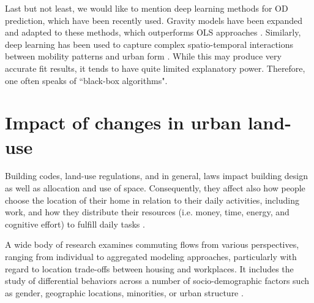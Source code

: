 Last but not least, we would like to mention deep learning methods for OD prediction, which have been recently used. Gravity models have been expanded and adapted to these methods, which outperforms OLS approaches \citep{Simini2021AGeneration}. Similarly, deep learning has been used to capture complex spatio-temporal interactions between mobility patterns and urban form \citep{Cai2022SpatialFlow, Koca2021Origin-destinationStudy, Yeghikyan2020LearningNetworks, Liu2020LearningPrediction, Yao2021SpatialNetworks, Yin2022ConvGCN-RF:Effects, Rodriguez-Rueda2021OriginDestinationModel}. While this may produce very accurate fit results, it tends to have quite limited explanatory power. Therefore, one often speaks of ``black-box algorithms".

\section{Impact of changes in urban land-use}
\label{sub:ETRCO2H_1.3intro_urban}

Building codes, land-use regulations, and in general, laws impact building design as well as allocation and use of space. Consequently, they affect also how people choose the location of their home in relation to their daily activities, including work, and how they distribute their resources (i.e. money, time, energy, and cognitive effort) to fulfill daily tasks \citep{Spadon2019ReconstructingIndicators, Simini2012APatterns, Prytherch2012, Levine2019FromPlanning, Jayarajah2018UnderstandingPlanning}. 

A wide body of research examines commuting flows from various perspectives, ranging from individual to aggregated modeling approaches, particularly with regard to location trade-offs between housing and workplaces. It includes the study of differential behaviors across a number of socio-demographic factors such as gender, geographic locations, minorities, or urban structure \citep{Farmer2011CommutingTravel-to-work, Rong2023AnTechniques}.

